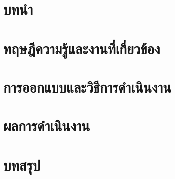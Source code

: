 \documentclass[a4paper,oneside]{cpe-thesis-th}
\begin{document}


\chapter{บทนำ}






\chapter{ทฤษฎีความรู้และงานที่เกี่ยวข้อง}






\chapter{การออกแบบและวิธีการดำเนินงาน}










\chapter{ผลการดำเนินงาน}


\chapter{บทสรุป}




\end{document}
